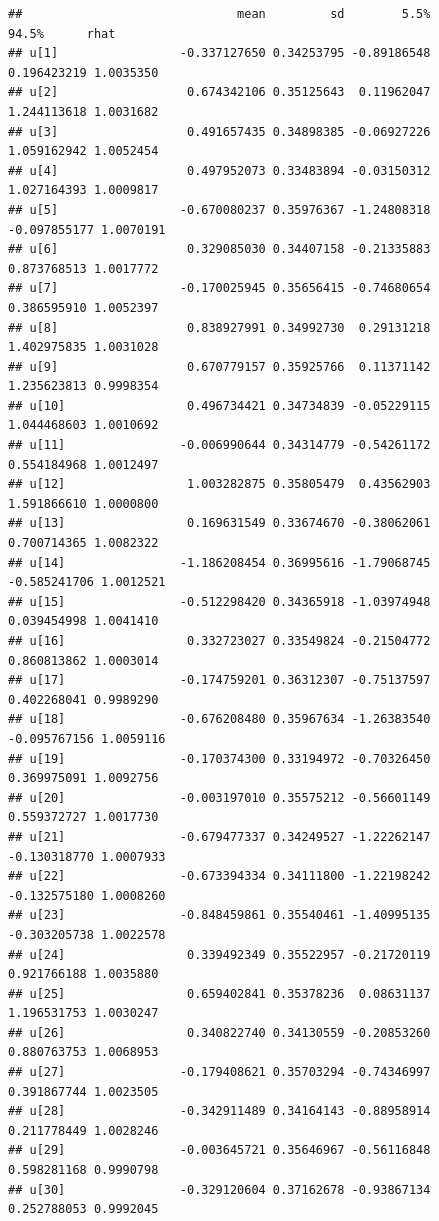 \documentclass[
]{book}
\begin{document}
\begin{verbatim}
##                              mean         sd        5.5%        94.5%      rhat
## u[1]                 -0.337127650 0.34253795 -0.89186548  0.196423219 1.0035350
## u[2]                  0.674342106 0.35125643  0.11962047  1.244113618 1.0031682
## u[3]                  0.491657435 0.34898385 -0.06927226  1.059162942 1.0052454
## u[4]                  0.497952073 0.33483894 -0.03150312  1.027164393 1.0009817
## u[5]                 -0.670080237 0.35976367 -1.24808318 -0.097855177 1.0070191
## u[6]                  0.329085030 0.34407158 -0.21335883  0.873768513 1.0017772
## u[7]                 -0.170025945 0.35656415 -0.74680654  0.386595910 1.0052397
## u[8]                  0.838927991 0.34992730  0.29131218  1.402975835 1.0031028
## u[9]                  0.670779157 0.35925766  0.11371142  1.235623813 0.9998354
## u[10]                 0.496734421 0.34734839 -0.05229115  1.044468603 1.0010692
## u[11]                -0.006990644 0.34314779 -0.54261172  0.554184968 1.0012497
## u[12]                 1.003282875 0.35805479  0.43562903  1.591866610 1.0000800
## u[13]                 0.169631549 0.33674670 -0.38062061  0.700714365 1.0082322
## u[14]                -1.186208454 0.36995616 -1.79068745 -0.585241706 1.0012521
## u[15]                -0.512298420 0.34365918 -1.03974948  0.039454998 1.0041410
## u[16]                 0.332723027 0.33549824 -0.21504772  0.860813862 1.0003014
## u[17]                -0.174759201 0.36312307 -0.75137597  0.402268041 0.9989290
## u[18]                -0.676208480 0.35967634 -1.26383540 -0.095767156 1.0059116
## u[19]                -0.170374300 0.33194972 -0.70326450  0.369975091 1.0092756
## u[20]                -0.003197010 0.35575212 -0.56601149  0.559372727 1.0017730
## u[21]                -0.679477337 0.34249527 -1.22262147 -0.130318770 1.0007933
## u[22]                -0.673394334 0.34111800 -1.22198242 -0.132575180 1.0008260
## u[23]                -0.848459861 0.35540461 -1.40995135 -0.303205738 1.0022578
## u[24]                 0.339492349 0.35522957 -0.21720119  0.921766188 1.0035880
## u[25]                 0.659402841 0.35378236  0.08631137  1.196531753 1.0030247
## u[26]                 0.340822740 0.34130559 -0.20853260  0.880763753 1.0068953
## u[27]                -0.179408621 0.35703294 -0.74346997  0.391867744 1.0023505
## u[28]                -0.342911489 0.34164143 -0.88958914  0.211778449 1.0028246
## u[29]                -0.003645721 0.35646967 -0.56116848  0.598281168 0.9990798
## u[30]                -0.329120604 0.37162678 -0.93867134  0.252788053 0.9992045

\end{verbatim}
\end{document}
